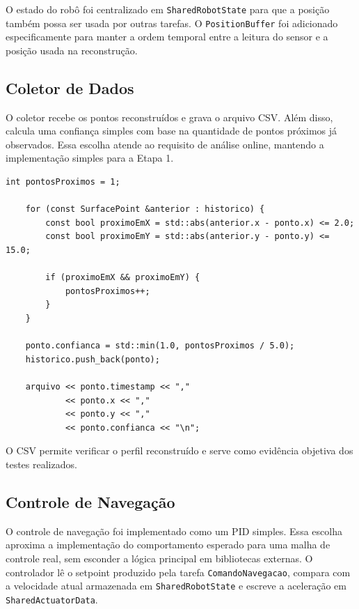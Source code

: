 \documentclass[12pt,a4paper]{article}
\begin{document}
    O estado do robô foi centralizado em \texttt{SharedRobotState} para que a posição também possa ser usada por outras tarefas. O \texttt{PositionBuffer} foi adicionado especificamente para manter a ordem temporal entre a leitura do sensor e a posição usada na reconstrução.

    \subsection{Coletor de Dados}

    O coletor recebe os pontos reconstruídos e grava o arquivo CSV. Além disso, calcula uma confiança simples com base na quantidade de pontos próximos já observados. Essa escolha atende ao requisito de análise online, mantendo a implementação simples para a Etapa 1.

    \begin{lstlisting}[style=cppstyle]
    int pontosProximos = 1;

    for (const SurfacePoint &anterior : historico) {
        const bool proximoEmX = std::abs(anterior.x - ponto.x) <= 2.0;
        const bool proximoEmY = std::abs(anterior.y - ponto.y) <= 15.0;

        if (proximoEmX && proximoEmY) {
            pontosProximos++;
        }
    }

    ponto.confianca = std::min(1.0, pontosProximos / 5.0);
    historico.push_back(ponto);

    arquivo << ponto.timestamp << ","
            << ponto.x << ","
            << ponto.y << ","
            << ponto.confianca << "\n";
    \end{lstlisting}

    O CSV permite verificar o perfil reconstruído e serve como evidência objetiva dos testes realizados.

    \subsection{Controle de Navegação}

    O controle de navegação foi implementado como um PID simples. Essa escolha aproxima a implementação do comportamento esperado para uma malha de controle real, sem esconder a lógica principal em bibliotecas externas. O controlador lê o setpoint produzido pela tarefa \texttt{ComandoNavegacao}, compara com a velocidade atual armazenada em \texttt{SharedRobotState} e escreve a aceleração em \texttt{SharedActuatorData}.
\end{document}
